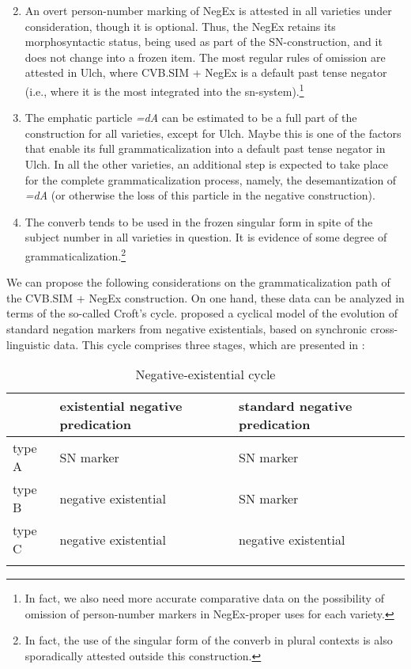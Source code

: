 \documentclass[output=paper]{langscibook}
\begin{document}
\begin{enumerate}
    \setcounter{enumi}{1}
    \item An overt person-number marking of NegEx is attested in all varieties under consideration, though it is optional. Thus, the NegEx retains its morphosyntactic status, being used as part of the SN-construction, and it does not change into a frozen item. The most regular rules of omission are attested in Ulch, where CVB.SIM + NegEx is a default past tense negator (i.e., where it is the most integrated into the sn-system).\footnote{In fact, we also need more accurate comparative data on the possibility of omission of person-number markers in NegEx-proper uses for each variety.}
    \item The emphatic particle \textit{=dA} can be estimated to be a full part of the construction for all varieties, except for Ulch. Maybe this is one of the factors that enable its full grammaticalization into a default past tense negator in Ulch. In all the other varieties, an additional step is expected to take place for the complete grammaticalization process, namely, the desemantization of \textit{=dA} (or otherwise the loss of this particle in the negative construction).
    \item The converb tends to be used in the frozen singular form in spite of the subject number in all varieties in question. It is evidence of some degree of grammaticalization.\footnote{In fact, the use of the singular form of the converb in plural contexts is also sporadically attested outside this construction.}
\end{enumerate}

We can propose the following considerations on the grammaticalization path of the CVB.SIM + NegEx construction. On one hand, these data can be analyzed in terms of the so-called Croft’s cycle. \citet{Croft1991} proposed a cyclical model of the evolution of standard negation markers from negative existentials, based on synchronic cross-linguistic data. This cycle comprises three stages, which are presented in :

\begin{table}
    \caption{Negative-existential cycle \citep{Croft1991}}
    \label{tab:T9}
    \begin{tabular}{lll}
    \lsptoprule
     & existential negative predication & standard negative predication \\ \midrule
    type A & SN marker & SN marker \\
    type B & negative existential & SN marker \\
    type C & negative existential & negative existential\footnotemark \\ \lspbottomrule
    \end{tabular}
\end{table}
\end{document}
